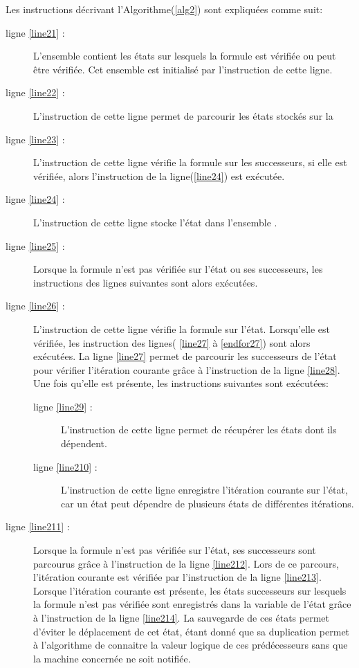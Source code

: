 Les instructions décrivant l'Algorithme(\ref{alg2}) sont expliquées comme suit:
\begin{description}
	\item[ligne \ref{line21} :] L'ensemble  contient les états sur lesquels la formule est vérifiée ou peut être vérifiée. Cet ensemble est initialisé par l'instruction de cette ligne.
	\item[ligne \ref{line22} :] L'instruction de cette ligne permet de parcourir les états stockés sur la \mi{}
	\item[ligne \ref{line23} :] L'instruction de cette ligne vérifie la formule sur les successeurs, si elle est vérifiée, alors l'instruction de la ligne(\ref{line24}) est exécutée. 
	\item[ligne \ref{line24} :] L'instruction de cette ligne stocke l'état dans l'ensemble .
	\item[ligne \ref{line25} :] Lorsque la formule n'est pas vérifiée sur l'état ou ses successeurs, les instructions  des lignes suivantes sont alors exécutées. 
	\item[ligne \ref{line26} :] L'instruction de cette ligne vérifie la formule sur l'état. Lorsqu'elle est vérifiée, les instruction des lignes( \ref{line27} à \ref{endfor27}) sont alors exécutées. La ligne \ref{line27} permet de parcourir les successeurs de l'état pour vérifier  l'itération courante grâce à l'instruction de la ligne \ref{line28}. Une fois qu'elle est présente, les instructions suivantes sont exécutées:
	\begin{description}
	\item[ligne \ref{line29} :] L'instruction de cette ligne permet de récupérer les états dont ils dépendent. 
	\item[ligne \ref{line210} :] L'instruction de cette ligne enregistre l'itération courante sur l'état, car un état peut dépendre de plusieurs états de différentes itérations. 
	\end{description}
	\item[ligne \ref{line211} :] Lorsque la formule n'est pas vérifiée sur l'état, ses successeurs sont parcourus grâce à l'instruction de la ligne \ref{line212}. Lors de ce parcours, l'itération courante est vérifiée par l'instruction de la ligne \ref{line213}.\\ Lorsque l'itération courante est présente, les états successeurs sur lesquels la formule n'est pas vérifiée sont enregistrés dans la variable  de l'état grâce à l'instruction de la ligne \ref{line214}. La sauvegarde de ces états permet d'éviter le déplacement de cet état, étant donné que sa duplication permet à l'algorithme de connaitre la valeur logique de ces prédécesseurs sans que la machine concernée ne soit notifiée.
	
\end{description}

